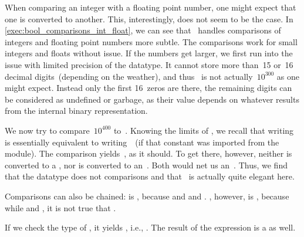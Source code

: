 When comparing an integer with a floating point number, one might expect that one is converted to another.
This, interestingly, does not seem to be the case.
In \cref{exec:bool_comparisons_int_float}, we can see that \python\ handles comparisons of integers and floating point numbers more subtle.
The comparisons work for small integers and floats without issue.
If the numbers get larger, we first run into the issue with limited precision of the  datatype.
It cannot store more than~15 or~16 decimal digits~(depending on the weather), and thus~ is not actually~$10^{300}$ as one might expect.
Instead only the first 16~zeros are there, the remaining digits can be considered as undefined or garbage, as their value depends on whatever results from the internal binary representation.

We now try to compare~$10^{400}$ to~.
Knowing the limits of , we recall that writing~ is essentially equivalent to writing~~(if that constant was imported from the  module).
The comparison yields~, as it should.
To get there, however, neither is  converted to a , nor is  converted to an~.
Both would net us an~.
Thus, we find that the  datatype does not  comparisons and that \python\ is actually quite elegant here.

Comparisons can also be chained:
 is , because  and  and .
, however, is , because while  and , it is not true that .

If we check the type of , it yields , i.e., .
The result of the expression  is a  as well.

